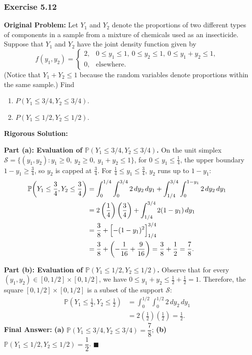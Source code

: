 \documentclass[11pt, letterpaper]{article}
\theoremstyle{definition}
\theoremstyle{remark}
\begin{document}
\bigskip

\subsubsection*{Exercise 5.12}
\textbf{Original Problem:} Let $Y_1$ and $Y_2$ denote the proportions of two different types of components in a sample from a mixture of chemicals used as an insecticide. Suppose that $Y_1$ and $Y_2$ have the joint density function given by
\[
    f(y_1, y_2) = \begin{cases}
        2, & 0 \le y_1 \le 1,\ 0 \le y_2 \le 1,\ 0 \le y_1 + y_2 \le 1, \\
        0, & \text{elsewhere.}
    \end{cases}
\]
(Notice that $Y_1 + Y_2 \le 1$ because the random variables denote proportions within the same sample.) Find
\begin{enumerate}[label=\textbf{\alph*}]
    \item $P(Y_1 \le 3/4, Y_2 \le 3/4)$.
    \item $P(Y_1 \le 1/2, Y_2 \le 1/2)$.
\end{enumerate}

\textbf{Rigorous Solution:}

\textbf{Part (a): Evaluation of $\mathbb{P}(Y_1 \le 3/4, Y_2 \le 3/4)$.}
On the unit simplex $\mathcal{S} = \{(y_1, y_2) : y_1 \ge 0,\ y_2 \ge 0,\ y_1 + y_2 \le 1\}$, for $0 \le y_1 \le \frac{1}{4}$, the upper boundary $1 - y_1 \ge \frac{3}{4}$, so $y_2$ is capped at $\frac{3}{4}$. For $\frac{1}{4} \le y_1 \le \frac{3}{4}$, $y_2$ runs up to $1 - y_1$:
\begin{align*}
    \mathbb{P}\!\left(Y_1 \le \frac{3}{4}, Y_2 \le \frac{3}{4}\right) 
    &= \int_{0}^{1/4} \int_{0}^{3/4} 2 \, dy_2 \, dy_1 + \int_{1/4}^{3/4} \int_{0}^{1 - y_1} 2 \, dy_2 \, dy_1 \\
    &= 2 \left(\frac{1}{4}\right)\left(\frac{3}{4}\right) + \int_{1/4}^{3/4} 2(1 - y_1) \, dy_1 \\
    &= \frac{3}{8} + \Bigl[ -(1 - y_1)^2 \Bigr]_{1/4}^{3/4} \\
    &= \frac{3}{8} + \left( -\frac{1}{16} + \frac{9}{16} \right) = \frac{3}{8} + \frac{1}{2} = \frac{7}{8}.
\end{align*}

\textbf{Part (b): Evaluation of $\mathbb{P}(Y_1 \le 1/2, Y_2 \le 1/2)$.}
Observe that for every $(y_1, y_2) \in [0, 1/2] \times [0, 1/2]$, we have $0 \le y_1 + y_2 \le \frac{1}{2} + \frac{1}{2} = 1$. Therefore, the square $[0, 1/2] \times [0, 1/2]$ is a subset of the support $\mathcal{S}$:
\begin{align*}
    \mathbb{P}\!\left(Y_1 \le \frac{1}{2}, Y_2 \le \frac{1}{2}\right) 
    &= \int_{0}^{1/2} \int_{0}^{1/2} 2 \, dy_2 \, dy_1 \\
    &= 2 \left(\frac{1}{2}\right) \left(\frac{1}{2}\right) = \frac{1}{2}.
\end{align*}
\textbf{Final Answer:} \textbf{(a)} $\mathbb{P}(Y_1 \le 3/4, Y_2 \le 3/4) = \dfrac{7}{8}$; \quad \textbf{(b)} $\mathbb{P}(Y_1 \le 1/2, Y_2 \le 1/2) = \dfrac{1}{2}$. $\blacksquare$
\end{document}
